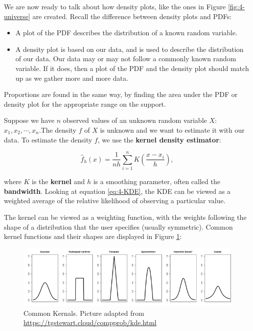 \documentclass[
]{book}
\providecommand{\tightlist}{%
  \setlength{\itemsep}{0pt}\setlength{\parskip}{0pt}}
\begin{document}
We are now ready to talk about how density plots, like the ones in Figure \ref{fig:4-universe} are created. Recall the difference between density plots and PDFs:

\begin{itemize}
\tightlist
\item
  A plot of the PDF describes the distribution of a known random variable.
\item
  A density plot is based on our data, and is used to describe the distribution of our data. Our data may or may not follow a commonly known random variable. If it does, then a plot of the PDF and the density plot should match up as we gather more and more data.
\end{itemize}

Proportions are found in the same way, by finding the area under the PDF or density plot for the appropriate range on the support.

Suppose we have \(n\) observed values of an unknown random variable \(X\): \(x_1, x_2, \cdots, x_n\).The density \(f\) of \(X\) is unknown and we want to estimate it with our data. To estimate the density \(f\), we use the \textbf{kernel density estimator}:

\begin{equation} 
\hat{f}_h(x) = \frac{1}{nh} \sum_{i=1}^n K \left( \frac{x-x_i}{h}\right ),
\label{eq:4-KDE}
\end{equation}

where \(K\) is the \textbf{kernel} and \(h\) is a smoothing parameter, often called the \textbf{bandwidth}. Looking at equation \eqref{eq:4-KDE}, the KDE can be viewed as a weighted average of the relative likelihood of observing a particular value.

The kernel can be viewed as a weighting function, with the weights following the shape of a distribution that the user specifies (usually symmetric). Common kernel functions and their shapes are displayed in Figure \ref{fig:4-KDE}:

\begin{figure}
\centering
\includegraphics{images/04-KDE.png}
\caption{\label{fig:4-KDE}Common Kernals. Picture adapted from \url{https://tgstewart.cloud/compprob/kde.html}}
\end{figure}
\end{document}
